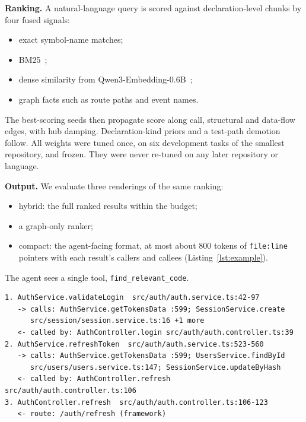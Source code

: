 \documentclass[sigconf,nonacm]{acmart}
\newcommand{\hyb}{\textsf{hybrid}\xspace}
\newcommand{\cmp}{\textsf{compact}\xspace}
\begin{document}
\smallskip\noindent\textbf{Ranking.} A natural-language query is scored against declaration-level chunks by four fused signals:
\begin{itemize}
\item exact symbol-name matches;
\item BM25~\cite{robertson2009bm25};
\item dense similarity from Qwen3-Embedding-0.6B~\cite{zhang2025qwen3embedding};
\item graph facts such as route paths and event names.
\end{itemize}
The best-scoring seeds then propagate score along call, structural and data-flow edges, with hub damping. Declaration-kind priors and a test-path demotion follow. All weights were tuned once, on six development tasks of the smallest repository, and frozen. They were never re-tuned on any later repository or language.

\smallskip\noindent\textbf{Output.} We evaluate three renderings of the same ranking:
\begin{itemize}
\item \hyb: the full ranked results within the budget;
\item a graph-only ranker;
\item \cmp: the agent-facing format, at most about 800 tokens of \texttt{file:line} pointers with each result's callers and callees (Listing~\ref{lst:example}).
\end{itemize}
The agent sees a single tool, \texttt{find\_relevant\_code}.

\begin{lstlisting}[float=t,caption={First three of twelve pointers returned by the \cmp tool for ``where are refresh tokens validated?'' on the smallest benchmark repository (752 tokens in total).},label=lst:example]
1. AuthService.validateLogin  src/auth/auth.service.ts:42-97
   -> calls: AuthService.getTokensData :599; SessionService.create
      src/session/session.service.ts:16 +1 more
   <- called by: AuthController.login src/auth/auth.controller.ts:39
2. AuthService.refreshToken  src/auth/auth.service.ts:523-560
   -> calls: AuthService.getTokensData :599; UsersService.findById
      src/users/users.service.ts:147; SessionService.updateByHash
   <- called by: AuthController.refresh src/auth/auth.controller.ts:106
3. AuthController.refresh  src/auth/auth.controller.ts:106-123
   <- route: /auth/refresh (framework)
\end{lstlisting}

\end{document}
